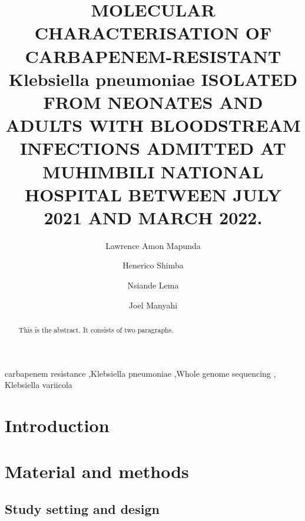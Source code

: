\documentclass[preprint, 3p,
authoryear]{elsarticle} %
\begin{document}
\begin{frontmatter}

  \title{MOLECULAR CHARACTERISATION OF CARBAPENEM-RESISTANT Klebsiella
pneumoniae ISOLATED FROM NEONATES AND ADULTS WITH BLOODSTREAM INFECTIONS
ADMITTED AT MUHIMBILI NATIONAL HOSPITAL BETWEEN JULY 2021 AND MARCH
2022.}
    \author[Tanzania National Public Health Laboratory]{Lawrence Amon
Mapunda%
  }
    \author[Bugando Medical Centre]{Henerico Shimba%
  }
    \author[Tanzania Field Epidemiology and Laboratory Training
Program]{Nsiande Lema%
  }
    \author[Muhimbili University of Health and Allied Sciences]{Joel
Manyahi%
  }
  
  \begin{abstract}
  This is the abstract. It consists of two paragraphs.
  \end{abstract}
    \begin{keyword}
    carbapenem resistance \sep Klebsiella pneumoniae \sep Whole genome
sequencing \sep 
    Klebsiella variicola
  \end{keyword}
  
 \end{frontmatter}

\section{Introduction}\label{introduction}

\section{Material and methods}\label{material-and-methods}

\subsection{Study setting and design}\label{study-setting-and-design}
\end{document}
